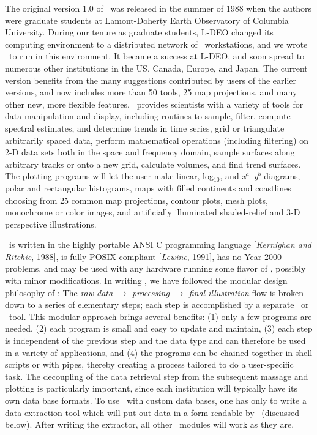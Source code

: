 The original version 1.0 of \GMT\ was released in the summer of 1988
when the authors were graduate students at Lamont-Doherty Earth
Observatory of Columbia University.
During our tenure as graduate
students, L-DEO changed its computing environment to a distributed
network of \UNIX\ workstations, and we wrote \GMT\ to run in this
environment.  It became a success at L-DEO, and soon spread to
numerous other institutions in the US, Canada, Europe, and Japan.
The current version benefits from the many suggestions
contributed by users of the earlier versions, and now includes more
than 50 tools, 25 map projections, and many other new, more
flexible features.  \GMT\ provides scientists with a variety of
tools for data mani\-pulation and display, including routines to sample,
filter, compute spectral estimates, and determine trends in time
series, grid or triangulate arbitrarily spaced data, perform
mathematical operations (including filtering) on 2-D data sets
both in the space and frequency domain, sample surfaces along
arbitrary tracks or onto a new grid, calculate volumes, and find
trend surfaces.  The plotting programs will let the user make linear,
log$_{10}$, and {\it x$^a$}--{\it y$^b$} diagrams, polar and
rectangular histograms, maps with filled continents and coastlines
choosing from 25 common map projections, contour plots, mesh plots,
monochrome or color images, and artificially illuminated
shaded-relief and 3-D perspective illustrations. 

\GMT\ is written in the highly portable ANSI C  programming language
[{\it Kernighan and Ritchie}, 1988], is fully POSIX compliant
[{\it Lewine}, 1991], has no Year 2000 problems, and may be used
with any hardware running some flavor of \UNIX, possibly with minor
modifications.  In writing \GMT, we have followed the modular
design philosophy of \UNIX: The {\it raw data $\rightarrow$  processing $\rightarrow$
final illustration} flow is broken down to a series of elementary
steps; each step is accomplished by a separate \GMT\ or \UNIX\ tool.
This modular approach brings several benefits: (1) only a few
programs are needed, (2) each program is small and easy to update
and maintain, (3) each step is independent of the previous step
and the data type and can therefore be used in a variety of
applications, and (4) the programs can be chained together in
shell scripts or with pipes, thereby creating a process tailored
to do a user-specific task.  The  decoupling of the data retrieval
step from the subsequent massage and plotting is particularly
important, since each institution will typically have its own
data base formats.  To use \GMT\ with custom data bases, one has
only to write a data extraction tool which will put out data in a
form readable by \GMT\ (discussed below).  After writing the extractor,
all other \GMT\ modules will work as they are. 

